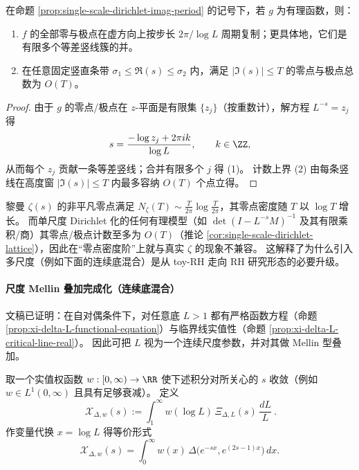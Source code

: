 \begin{corollary}[零/极点的梳齿晶格与线性计数上界]\label{cor:single-scale-dirichlet-lattice}
在命题 \ref{prop:single-scale-dirichlet-imag-period} 的记号下，若 \(g\) 为有理函数，则：
\begin{enumerate}
  \item \(f\) 的全部零与极点在虚方向上按步长 \(2\pi/\log L\) 周期复制；更具体地，它们是有限多个等差竖线簇的并。
  \item 在任意固定竖直条带 \(\sigma_1\le \Re(s)\le \sigma_2\) 内，满足 \(|\Im(s)|\le T\) 的零点与极点总数为 \(O(T)\)。
\end{enumerate}
\end{corollary}
\begin{proof}
由于 \(g\) 的零点/极点在 \(z\)-平面是有限集 \(\{z_j\}\)（按重数计），解方程 \(L^{-s}=z_j\) 得
\[
s=\frac{-\log z_j+2\pi i k}{\log L},\qquad k\in\ZZ,
\]
从而每个 \(z_j\) 贡献一条等差竖线；合并有限多个 \(j\) 得 (1)。
计数上界 (2) 由每条竖线在高度窗 \(|\Im(s)|\le T\) 内最多容纳 \(O(T)\) 个点立得。
\end{proof}

\begin{remark}\label{rem:single-scale-dirichlet-obstruction}
黎曼 \(\zeta(s)\) 的非平凡零点满足 \(N_\zeta(T)\sim \frac{T}{2\pi}\log\frac{T}{2\pi}\)，其零点密度随 \(T\) 以 \(\log T\) 增长。
而单尺度 Dirichlet 化的任何有理模型（如 \(\det(I-L^{-s}M)^{-1}\) 及其有限乘积/商）其零点/极点计数至多为 \(O(T)\)（推论 \ref{cor:single-scale-dirichlet-lattice}），因此在“零点密度阶”上就与真实 \(\zeta\) 的现象不兼容。
这解释了为什么引入多尺度（例如下面的连续底混合）是从 toy-RH 走向 RH 研究形态的必要升级。
\end{remark}

\paragraph{尺度 Mellin 叠加完成化（连续底混合）}
文稿已证明：在自对偶条件下，对任意底 \(L>1\) 都有严格函数方程（命题 \ref{prop:xi-delta-L-functional-equation}）与临界线实值性（命题 \ref{prop:xi-delta-L-critical-line-real}）。
因此可把 \(L\) 视为一个连续尺度参数，并对其做 Mellin 型叠加。

\begin{definition}[尺度叠加完成化]\label{def:xi-scale-mellin-superposition}
取一个实值权函数 \(w:[0,\infty)\to\RR\) 使下述积分对所关心的 \(s\) 收敛（例如 \(w\in L^1(0,\infty)\) 且具有足够衰减）。
定义
\[
\boxed{\ \mathcal X_{\Delta,w}(s):=\int_{1}^{\infty} w(\log L)\,\Xi_{\Delta,L}(s)\,\frac{dL}{L}\ }.
\]
作变量代换 \(x=\log L\) 得等价形式
\[
\mathcal X_{\Delta,w}(s)=\int_0^\infty w(x)\,\Delta\!\bigl(e^{-sx},e^{(2s-1)x}\bigr)\,dx.
\]
\end{definition}

